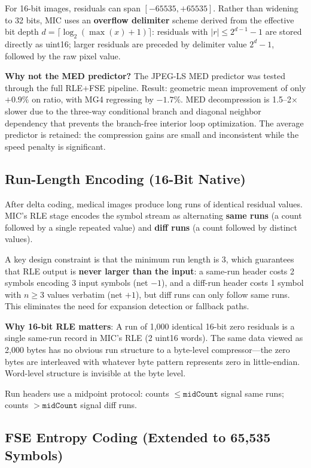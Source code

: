 \documentclass[10pt,twocolumn]{article}
\begin{document}
For 16-bit images, residuals can span $[-65535, +65535]$. Rather than widening to 32 bits, MIC uses an \textbf{overflow delimiter} scheme derived from the effective bit depth $d = \lceil\log_2(\max(x)+1)\rceil$: residuals with $|r| \leq 2^{d-1} - 1$ are stored directly as uint16; larger residuals are preceded by delimiter value $2^d - 1$, followed by the raw pixel value.

\textbf{Why not the MED predictor?} The JPEG-LS MED predictor was tested through the full RLE+FSE pipeline. Result: geometric mean improvement of only $+0.9\%$ on ratio, with MG4 regressing by $-1.7\%$. MED decompression is 1.5--2$\times$ slower due to the three-way conditional branch and diagonal neighbor dependency that prevents the branch-free interior loop optimization. The average predictor is retained: the compression gains are small and inconsistent while the speed penalty is significant.

\subsection{Run-Length Encoding (16-Bit Native)}

After delta coding, medical images produce long runs of identical residual values. MIC's RLE stage encodes the symbol stream as alternating \textbf{same runs} (a count followed by a single repeated value) and \textbf{diff runs} (a count followed by distinct values).

A key design constraint is that the minimum run length is 3, which guarantees that RLE output is \textbf{never larger than the input}: a same-run header costs 2 symbols encoding 3 input symbols (net $-1$), and a diff-run header costs 1 symbol with $n \geq 3$ values verbatim (net $+1$), but diff runs can only follow same runs. This eliminates the need for expansion detection or fallback paths.

\textbf{Why 16-bit RLE matters}: A run of 1,000 identical 16-bit zero residuals is a single same-run record in MIC's RLE (2 uint16 words). The same data viewed as 2,000 bytes has no obvious run structure to a byte-level compressor---the zero bytes are interleaved with whatever byte pattern represents zero in little-endian. Word-level structure is invisible at the byte level.

Run headers use a midpoint protocol: counts $\leq \mathtt{midCount}$ signal same runs; counts $> \mathtt{midCount}$ signal diff runs.

\subsection{FSE Entropy Coding (Extended to 65,535 Symbols)}
\end{document}
